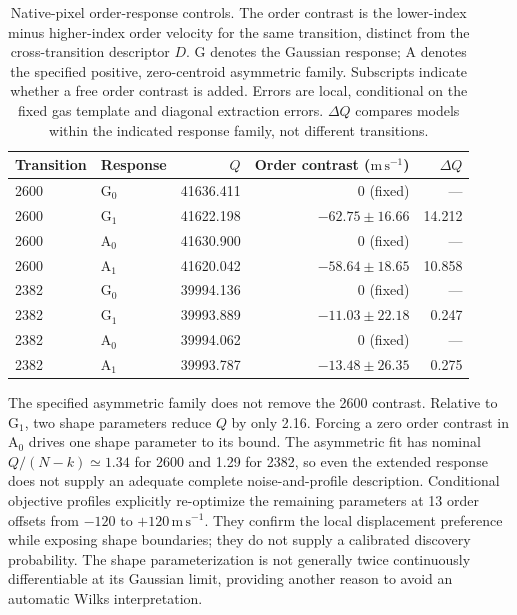 \begin{table}[htbp]
\centering
\caption{Native-pixel order-response controls. The order contrast is the lower-index minus higher-index order velocity for the same transition, distinct from the cross-transition descriptor $D$. G denotes the Gaussian response; A denotes the specified positive, zero-centroid asymmetric family. Subscripts indicate whether a free order contrast is added. Errors are local, conditional on the fixed gas template and diagonal extraction errors. $\Delta Q$ compares models within the indicated response family, not different transitions.}
\label{tab:order_models}
\small
\begin{tabular}{llrrr}
\toprule
Transition & Response & $Q$ & Order contrast ($\mathrm{m\,s^{-1}}$) & $\Delta Q$ \\
\midrule
2600 & G$_0$ & 41636.411 & 0 (fixed) & --- \\
2600 & G$_1$ & 41622.198 & $-62.75\pm16.66$ & 14.212 \\
2600 & A$_0$ & 41630.900 & 0 (fixed) & --- \\
2600 & A$_1$ & 41620.042 & $-58.64\pm18.65$ & 10.858 \\
2382 & G$_0$ & 39994.136 & 0 (fixed) & --- \\
2382 & G$_1$ & 39993.889 & $-11.03\pm22.18$ & 0.247 \\
2382 & A$_0$ & 39994.062 & 0 (fixed) & --- \\
2382 & A$_1$ & 39993.787 & $-13.48\pm26.35$ & 0.275 \\
\bottomrule
\end{tabular}
\end{table}

The specified asymmetric family does not remove the 2600 contrast. Relative to G$_1$, two shape parameters reduce $Q$ by only 2.16. Forcing a zero order contrast in A$_0$ drives one shape parameter to its bound. The asymmetric fit has nominal $Q/(N-k)\simeq1.34$ for 2600 and 1.29 for 2382, so even the extended response does not supply an adequate complete noise-and-profile description. Conditional objective profiles explicitly re-optimize the remaining parameters at 13 order offsets from $-120$ to $+120\,\mathrm{m\,s^{-1}}$. They confirm the local displacement preference while exposing shape boundaries; they do not supply a calibrated discovery probability. The shape parameterization is not generally twice continuously differentiable at its Gaussian limit, providing another reason to avoid an automatic Wilks interpretation.

